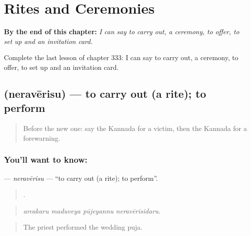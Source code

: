 
\chapter{Rites and Ceremonies}
\label{ch:ka-rites-and-ceremonies}

\begin{chapteropening}
\textbf{By the end of this chapter:} \emph{I can say to carry out, a ceremony, to offer, to set up and an invitation card.}

Complete the last lesson of chapter 333: I can say to carry out, a ceremony, to offer, to set up and an invitation card.
\end{chapteropening}

\section[\texorpdfstring{\kn{ನೆರವೇರಿಸು} (neravērisu)}{ನೆರವೇರಿಸು (neravērisu)}]{ (neravērisu) — to carry out (a rite); to perform}

\label{lesson:KA-C333-neraverisu}



\begin{quote}
Before the new one: say the Kannada for a victim, then the Kannada for a forewarning.
\end{quote}

\subsection*{You'll want to know: }
\textbf{} — \emph{neravērisu} — \textquotedblleft{}to carry out (a rite); to perform\textquotedblright{}.

\begin{quote}
   .
\end{quote}

\begin{quote}
\emph{arcakaru maduveya pūjeyannu neravērisidaru.}
\end{quote}

\begin{quote}
The priest performed the wedding puja.
\end{quote}

